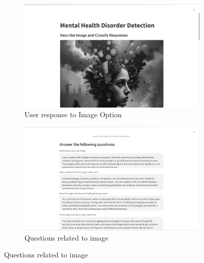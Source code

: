 \begin{figure}[h!]
    \centering
    \begin{subfigure}[b]{0.495\textwidth}
        \centering
        \includegraphics[width=\textwidth]{App Images/26 Interface.png}
        \caption*{User response to Image Option}
        \label{fig:26Interface}
    \end{subfigure}
    \hfill
    \begin{subfigure}[b]{0.495\textwidth}
        \centering
        \includegraphics[width=\textwidth]{App Images/27 Interface.png}
        \caption*{Questions related to image}
        \label{fig:27Interface}
    \end{subfigure}
    \label{fig:imageResponseAndQuestions}
\end{figure}

\vspace{-2em}

